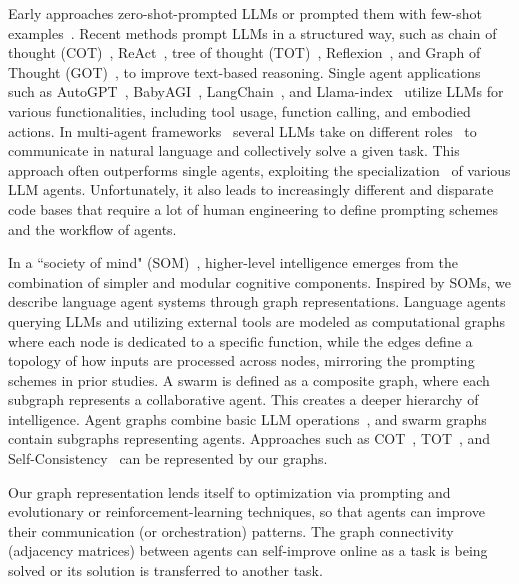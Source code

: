 \documentclass{article}
\theoremstyle{plain}
\theoremstyle{definition}
\theoremstyle{remark}
\begin{document}
Early approaches zero-shot-prompted LLMs or prompted them with few-shot examples~\citep{kojima2022large,brown2020language}. 
Recent methods prompt LLMs in a structured way, such as chain of thought (COT)~\citep{wei2022chain}, ReAct~\citep{yao2022react}, tree of thought (TOT)~\citep{yao2023tree}, Reflexion~\citep{shinn2023reflexion}, and Graph of Thought (GOT)~\citep{besta2023graph}, to improve text-based reasoning.
Single agent applications such as AutoGPT~\citep{autogpt_github}, BabyAGI~\citep{nakajima2023babyagi}, LangChain~\citep{Chase_LangChain_2022}, and Llama-index~\citep{Liu_LlamaIndex_2022} utilize LLMs for various functionalities, including tool usage, function calling, and embodied actions.
In multi-agent frameworks~\citep{zeng2022socratic,zhuge2023mindstorms} several LLMs take on different roles~\citep{li2023camel,park2023generative,qian2023communicative,wu2023autogen} 
to communicate in natural language and collectively solve a given task.
This approach often outperforms single agents, exploiting the specialization~\citep{hong2023metagpt} of various LLM agents. 
Unfortunately, it also leads to increasingly different and disparate code bases that require a lot of human engineering to define prompting schemes and the workflow of agents.

In a ``society of mind" (SOM)~\citep{minsky1988society,zhuge2023mindstorms}, higher-level intelligence emerges from the combination of simpler and modular cognitive components. Inspired by SOMs, we describe language agent systems through graph representations.
Language agents querying LLMs and utilizing external tools are modeled as computational graphs where each node is dedicated to a specific function, while the edges define a topology of how inputs are processed across nodes, mirroring the prompting schemes in prior studies.
A swarm is defined as a composite graph, where each subgraph represents a collaborative agent.
This creates a deeper hierarchy of intelligence. Agent graphs combine basic LLM operations~\citep{kennedy2006swarm,nepusz2013hierarchical}, and swarm graphs contain subgraphs representing agents.
Approaches such as COT~\citep{wei2022chain}, TOT~\citep{yao2023tree}, and Self-Consistency~\citep{wang2022self} can be represented by our graphs.

Our graph representation lends itself to optimization via prompting and evolutionary or reinforcement-learning techniques, so that agents can improve their communication (or orchestration) patterns. The graph connectivity (adjacency matrices) between agents can self-improve online as a task is being solved or its solution is transferred to another task.
\end{document}
